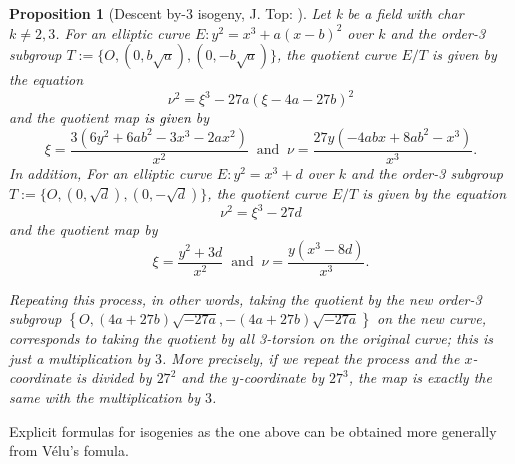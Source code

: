 \documentclass[a4paper, 11pt]{article}
\theoremstyle{plain}
\newtheorem{prop}[defn]{Proposition}
\newcommand{\?}{\textcolor{red}{??}}
\begin{document}
\begin{prop}[Descent by-$3$ isogeny, J. Top: {\cite[\S 3]{Top}}]
\label{descent_3_isogeny}
    Let k be a field with char $k\neq 2,3$. 
    For an elliptic curve $E:y^2=x^3+a(x-b)^2$ over $k$ and the order-3 subgroup $T:=\{O,(0,b\sqrt{a}),(0,-b\sqrt{a})\}$, the quotient curve $E/T$ is given by the equation
    \[
    {\nu}^2={\xi}^3-27a(\xi-4a-27b)^2
    \]
    and the quotient map \textcolor{black}{is given} by
    \[
    \xi=\frac{3(6y^2+6ab^2-3x^3-2ax^2)}{x^2} \ \text{ and } \ \nu=\frac{27y(-4abx+8ab^2-x^3)}{x^3}.
    \]
    In addition, For an elliptic curve $E:y^2=x^3+d$ over $k$ and the order-3 subgroup $T:=\{O,(0,\sqrt{d}),(0,-\sqrt{d})\}$, the quotient curve $E/T$ is given by the equation
    \[
    {\nu}^2={\xi}^3-27d
    \]
    and the quotient map by
    \[
    \xi=\frac{y^2+3d}{x^2} \ \text{ and } \ \nu=\frac{y(x^3-8d)}{x^3}.
    \]
    
    Repeating this process, in other words, taking the quotient by the new order-3 subgroup 
    $
    \left\{O,(4a+27b)\sqrt{-27a},-(4a+27b)\sqrt{-27a}\right\}$ on the new curve, corresponds to taking the quotient by all 3-torsion on the original curve; this is just a multiplication by $3$. More precisely, if we repeat the process and the $x$-coordinate is divided by $27^2$ and the $y$-coordinate by $27^3$, the map is exactly the same with the multiplication by $3$.  %
\end{prop}
 Explicit formulas for isogenies as the one above can be obtained more generally from V\'elu's fomula.
\end{document}
